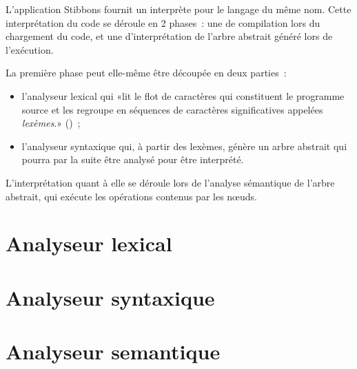 L'application Stibbons fournit un interprète pour le langage du même nom. Cette interprétation du code se déroule en 2 phases~: une de compilation lors du chargement du code, et une d'interprétation de l'arbre abstrait généré lors de l'exécution.

La première phase peut elle-même être découpée en deux parties~:
\begin{itemize}
\item l'analyseur lexical qui «lit le flot de caractères qui constituent le programme source et les regroupe en séquences de caractères significatives appelées \emph{lexèmes}.» (\cite{compilateurs})~;
\item l'analyseur syntaxique qui, à partir des lexèmes, génère un arbre abstrait qui pourra par la suite être analysé pour être interprété.
\end{itemize}

L'interprétation quant à elle se déroule lors de l'analyse sémantique de l'arbre abstrait, qui exécute les opérations contenus par les nœuds.

\section{Analyseur lexical}


\section{Analyseur syntaxique}


\section{Analyseur semantique}

